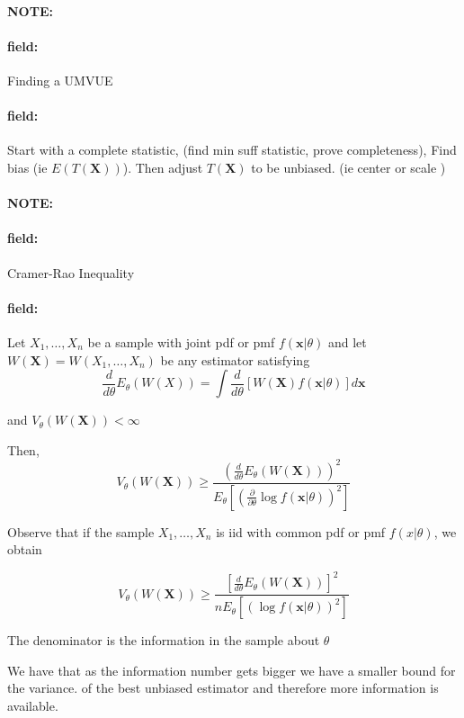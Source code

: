 \documentclass[12pt]{article}
\newenvironment{note}{\paragraph{NOTE:}}{}
\newenvironment{field}{\paragraph{field:}}{}
\begin{document}
\begin{note}
  \begin{field}
    Finding a UMVUE
  \end{field}
  \begin{field}
    Start with a complete statistic, (find min suff statistic, prove completeness), Find bias (ie $E(T(\mathbf{X}))$). Then adjust $T(\mathbf{X})$ to be unbiased. (ie center or scale )
  \end{field}
\end{note}

\begin{note}
  \begin{field}
    Cramer-Rao Inequality
  \end{field}
  \begin{field}
    Let $X_1, \ldots , X_n$ be a sample with joint pdf or pmf $f(\mathbf{x}|\theta)$ and let $W(\mathbf{X}) = W(X_1, \ldots , X_n)$ be any estimator satisfying
    $$\frac{d}{d\theta} E_\theta(W(X)) = \int \frac{d}{d\theta} [W(\mathbf{X})f(\mathbf{x}|\theta)] d \mathbf{x}$$

    and $V_\theta(W(\mathbf{X}))< \infty$

    Then,
    $$V_\theta(W(\mathbf{X})) \geq \frac{(\frac{d}{d\theta}E_\theta(W(\mathbf{X})))^2}{E_\theta[( \frac{\partial}{\partial \theta}\log f(\mathbf{x}|\theta))^2]}$$

    Observe that if the sample $X_1, \ldots , X_n$ is iid with common pdf or pmf $f(x|\theta)$, we obtain

    $$ V_\theta (W(\mathbf{X})) \geq \frac{[\frac{d}{d\theta}E_\theta(W(\mathbf{X}))]^2}{nE_\theta[(\log f(\mathbf{x}|\theta))^2]}$$

    The denominator is the information in the sample about $\theta$

    We have that as the information number gets bigger we have a smaller bound for the variance. of the best unbiased estimator and therefore more information is available.
  \end{field}
\end{note}
\end{document}
